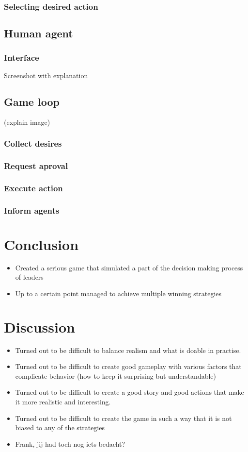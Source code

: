 \documentclass[11pt,a4paper]{article}
\begin{document}
    \subsubsection{Selecting desired action}
  \subsection{Human agent}
    \subsubsection{Interface}
    Screenshot with explanation
  \subsection{Game loop} 
  (explain image)
    \subsubsection{Collect desires}
    \subsubsection{Request aproval}
    \subsubsection{Execute action}
    \subsubsection{Inform agents}


\section{Conclusion}
  \begin{itemize}
    \item Created a serious game that simulated a part of the decision making process of leaders
    \item Up to a certain point managed to achieve multiple winning strategies
  \end{itemize}
\section{Discussion}
  \begin{itemize}
    \item Turned out to be difficult to balance realism and what is doable in practise.
    \item Turned out to be difficult to create good gameplay with various factors that complicate behavior (how to keep it surprising but understandable)
    \item Turned out to be difficult to create a good story and good actions that make it more realistic and interesting.
    \item Turned out to be difficult to create the game in such a way that it is not biased to any of the strategies
    \item Frank, jij had toch nog iets bedacht?
  \end{itemize}
\end{document}

